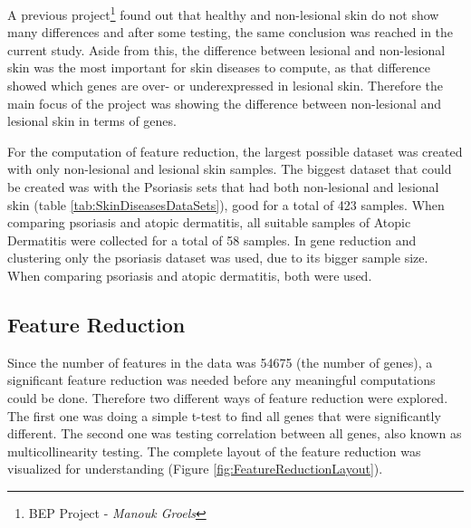 \documentclass[10pt,a4paper]{article}
\begin{document}
	A previous project\footnote{BEP Project -\textit{ Manouk Groels}} found out that healthy and non-lesional skin do not show many differences and after some testing, the same conclusion was reached in the current study. Aside from this, the difference between lesional and non-lesional skin was the most important for skin diseases to compute, as that difference showed which genes are over- or underexpressed in lesional skin. Therefore the main focus of the project was showing the difference between non-lesional and lesional skin in terms of genes. 
	
	For the computation of feature reduction, the largest possible dataset was created with only non-lesional and lesional skin samples. The biggest dataset that could be created was with the Psoriasis sets that had both non-lesional and lesional skin (table \ref{tab:SkinDiseasesDataSets}), good for a total of 423 samples. When comparing psoriasis and atopic dermatitis, all suitable samples of Atopic Dermatitis were collected for a total of 58 samples. In gene reduction and clustering only the psoriasis dataset was used, due to its bigger sample size. When comparing psoriasis and atopic dermatitis, both were used.
	
	\subsection{Feature Reduction}
	\label{subsec:MethodsFeatureReduction}
	
	Since the number of features in the data was 54675 (the number of genes), a significant feature reduction was needed before any meaningful computations could be done. Therefore two different ways of feature reduction were explored. The first one was doing a simple t-test to find all genes that were significantly different. The second one was testing correlation between all genes, also known as multicollinearity testing. The complete layout of the feature reduction was visualized for understanding (Figure \ref{fig:FeatureReductionLayout}).
	
\end{document}
